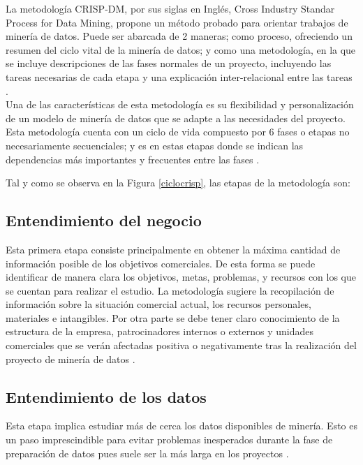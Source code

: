 La metodología CRISP-DM, por sus siglas en Inglés, Cross Industry Standar Process for Data Mining, propone un método probado para orientar trabajos de minería de datos. Puede ser abarcada de 2 maneras; como proceso, ofreciendo un resumen del ciclo vital de la minería de datos; y como una metodología, en la que se incluye descripciones de las fases normales de un proyecto, incluyendo las tareas necesarias de cada etapa y una explicación inter-relacional entre las tareas \cite{ibmcrisp}.\\


Una de las características de esta metodología es su flexibilidad y personalización de un modelo de minería de datos que se adapte a las necesidades del proyecto. Esta metodología cuenta con un ciclo de vida compuesto por 6 fases o etapas no necesariamente secuenciales; y es en estas etapas donde se indican las dependencias más importantes y frecuentes entre las fases \cite{ibmcrisp}.



Tal y como se observa en la Figura \ref{ciclocrisp}, las etapas de la metodología son:





\subsection{Entendimiento del negocio} 
Esta primera etapa consiste principalmente en obtener la máxima cantidad de información posible de los objetivos comerciales. De esta forma se puede identificar de manera clara los objetivos, metas, problemas, y recursos con los que se cuentan para realizar el estudio. La metodología sugiere la recopilación de información sobre la situación comercial actual, los recursos personales, materiales e intangibles. Por otra parte se debe tener claro conocimiento de la estructura de la empresa, patrocinadores internos o externos y unidades comerciales que se verán afectadas positiva o negativamente tras la realización del proyecto de minería de datos \cite{ibmcrisp}.

\subsection{Entendimiento de los datos}
Esta etapa implica estudiar más de cerca los datos disponibles de minería. Esto es un paso imprescindible para evitar problemas inesperados durante la fase de preparación de datos pues suele ser la más larga en los proyectos \cite{ibmcrisp}.\\

